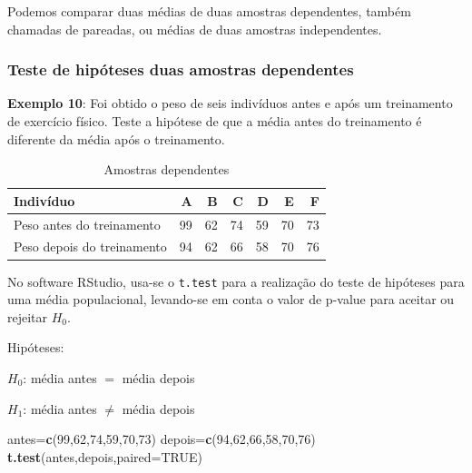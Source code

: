 \documentclass[12pt,brazil,oneside]{book}
\newenvironment{Shaded}{\begin{snugshade}}{\end{snugshade}}
\newcommand{\DataTypeTok}[1]{\textcolor[rgb]{0.13,0.29,0.53}{#1}}
\newcommand{\DecValTok}[1]{\textcolor[rgb]{0.00,0.00,0.81}{#1}}
\newcommand{\KeywordTok}[1]{\textcolor[rgb]{0.13,0.29,0.53}{\textbf{#1}}}
\newcommand{\NormalTok}[1]{#1}
\newcommand{\OtherTok}[1]{\textcolor[rgb]{0.56,0.35,0.01}{#1}}
\begin{document}
Podemos comparar duas médias de duas amostras dependentes, também chamadas de pareadas, ou médias de duas amostras independentes.

\hypertarget{teste-de-hipoteses-duas-amostras-dependentes}{%
\subsubsection{Teste de hipóteses duas amostras dependentes}\label{teste-de-hipoteses-duas-amostras-dependentes}}

\textbf{Exemplo 10}: Foi obtido o peso de seis indivíduos antes e após um treinamento de exercício físico. Teste a hipótese de que a média antes do treinamento é diferente da média após o treinamento.

\begin{table}

\caption{\label{tab:unnamed-chunk-109}Amostras dependentes}
\centering
\begin{tabular}[t]{l|r|r|r|r|r|r}
\hline
Indivíduo & A & B & C & D & E & F\\
\hline
Peso antes do treinamento & 99 & 62 & 74 & 59 & 70 & 73\\
\hline
Peso depois do treinamento & 94 & 62 & 66 & 58 & 70 & 76\\
\hline
\end{tabular}
\end{table}

No software RStudio, usa-se o \texttt{t.test} para a realização do teste de hipóteses para uma média populacional, levando-se em conta o valor de p-value para aceitar ou rejeitar \(H_0\).

Hipóteses:

\textbf{\(H_0\)}: média antes \(=\) média depois

\textbf{\(H_1\)}: média antes \(\neq\) média depois

\begin{Shaded}
\begin{Highlighting}[]
\NormalTok{antes=}\KeywordTok{c}\NormalTok{(}\DecValTok{99}\NormalTok{,}\DecValTok{62}\NormalTok{,}\DecValTok{74}\NormalTok{,}\DecValTok{59}\NormalTok{,}\DecValTok{70}\NormalTok{,}\DecValTok{73}\NormalTok{)}
\NormalTok{depois=}\KeywordTok{c}\NormalTok{(}\DecValTok{94}\NormalTok{,}\DecValTok{62}\NormalTok{,}\DecValTok{66}\NormalTok{,}\DecValTok{58}\NormalTok{,}\DecValTok{70}\NormalTok{,}\DecValTok{76}\NormalTok{)}
\KeywordTok{t.test}\NormalTok{(antes,depois,}\DataTypeTok{paired=}\OtherTok{TRUE}\NormalTok{)}
\end{Highlighting}
\end{Shaded}
\end{document}
